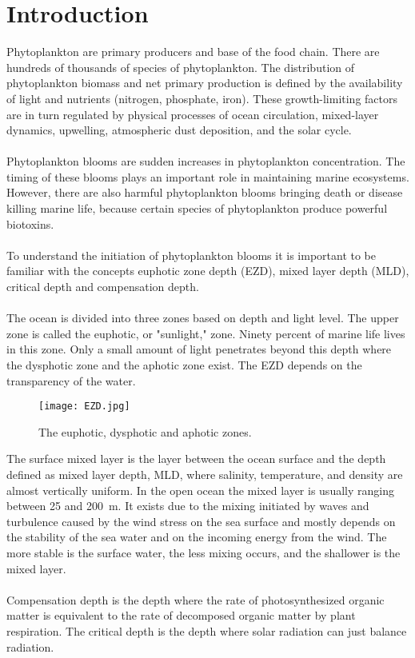 \documentclass[../Main.tex]{subfiles}
\begin{document}
\section*{\crule[blue]{.3cm}{.3cm} Introduction}
Phytoplankton are primary producers and base of the food chain. 
There are hundreds of thousands of species of phytoplankton. 
The distribution of phytoplankton biomass and net primary production is defined by the availability of light and nutrients (nitrogen, phosphate, iron). 
These growth-limiting factors are in turn regulated by physical processes of ocean circulation, mixed-layer dynamics, upwelling, atmospheric dust deposition, and the solar cycle.\supercite{}
\\
\\
Phytoplankton blooms are sudden increases in phytoplankton concentration. 
The timing of these blooms plays an important role in maintaining marine ecosystems. 
However, there are also harmful phytoplankton blooms bringing death or disease killing marine life, 
because certain species of phytoplankton produce powerful biotoxins.\supercite{}
\\
\\
To understand the initiation of phytoplankton blooms it is important to be familiar with the concepts euphotic zone depth (EZD), mixed layer depth (MLD), 
critical depth and compensation depth. 
\\
\\
The ocean is divided into three zones based on depth and light level. 
The upper zone is called the euphotic, or "sunlight," zone. 
Ninety percent of marine life lives in this zone. 
Only a small amount of light penetrates beyond this depth where the dysphotic zone and the aphotic zone exist. 
The EZD depends on the transparency of the water.\supercite{}

\begin{figure}[H]
\texttt{[image: EZD.jpg]}
\caption{ The euphotic, dysphotic and aphotic zones.\supercite{}}
\end{figure}
The surface mixed layer is the layer between the ocean surface and the depth defined as mixed layer depth, MLD, 
where salinity, temperature, and density are almost vertically uniform. 
In the open ocean the mixed layer is usually ranging between 25 and \SI{200}{m}. 
It exists due to the mixing initiated by waves and turbulence caused by the wind stress on the sea surface and mostly depends on the stability of the sea water and on the incoming energy from the wind. 
The more stable is the surface water, the less mixing occurs, and the shallower is the mixed layer.\supercite{}
\\
\\
Compensation depth is the depth where the rate of photosynthesized organic matter is equivalent to the rate of decomposed organic matter by plant respiration. 
The critical depth is the depth where solar radiation can just balance radiation.\supercite{}
\end{document}
